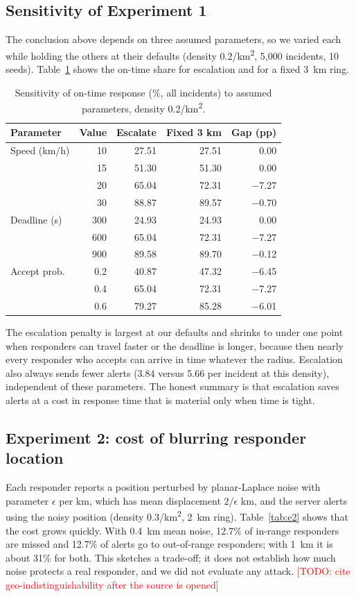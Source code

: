 \documentclass[conference]{IEEEtran}
\newcommand{\todo}[1]{\textcolor{red}{[TODO: #1]}}
\begin{document}
\subsection{Sensitivity of Experiment 1}
The conclusion above depends on three assumed parameters, so we varied each while holding the others at their defaults (density 0.2/km\textsuperscript{2}, 5{,}000 incidents, 10 seeds). Table~\ref{tab:e4} shows the on-time share for escalation and for a fixed 3~km ring.

\begin{table}[t]
\caption{Sensitivity of on-time response (\%, all incidents) to assumed parameters, density 0.2/km\textsuperscript{2}.}
\label{tab:e4}
\centering
\small
\begin{tabular}{@{}lrrrr@{}}
\toprule
Parameter & Value & Escalate & Fixed 3 km & Gap (pp) \\
\midrule
Speed (km/h) & 10 & 27.51 & 27.51 & 0.00 \\
 & 15 & 51.30 & 51.30 & 0.00 \\
 & 20 & 65.04 & 72.31 & $-$7.27 \\
 & 30 & 88.87 & 89.57 & $-$0.70 \\
\midrule
Deadline (s) & 300 & 24.93 & 24.93 & 0.00 \\
 & 600 & 65.04 & 72.31 & $-$7.27 \\
 & 900 & 89.58 & 89.70 & $-$0.12 \\
\midrule
Accept prob. & 0.2 & 40.87 & 47.32 & $-$6.45 \\
 & 0.4 & 65.04 & 72.31 & $-$7.27 \\
 & 0.6 & 79.27 & 85.28 & $-$6.01 \\
\bottomrule
\end{tabular}
\end{table}

The escalation penalty is largest at our defaults and shrinks to under one point when responders can travel faster or the deadline is longer, because then nearly every responder who accepts can arrive in time whatever the radius. Escalation also always sends fewer alerts (3.84 versus 5.66 per incident at this density), independent of these parameters. The honest summary is that escalation saves alerts at a cost in response time that is material only when time is tight.

\subsection{Experiment 2: cost of blurring responder location}
Each responder reports a position perturbed by planar-Laplace noise with parameter $\epsilon$ per km, which has mean displacement $2/\epsilon$ km, and the server alerts using the noisy position (density 0.3/km\textsuperscript{2}, 2~km ring). Table~\ref{tab:e2} shows that the cost grows quickly. With 0.4~km mean noise, 12.7\% of in-range responders are missed and 12.7\% of alerts go to out-of-range responders; with 1~km it is about 31\% for both. This sketches a trade-off; it does not establish how much noise protects a real responder, and we did not evaluate any attack. \todo{cite geo-indistinguishability after the source is opened}
\end{document}
